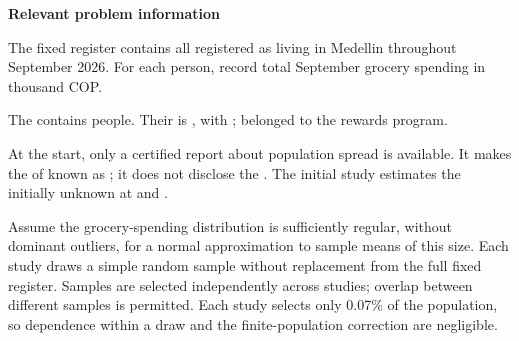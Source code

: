 \secInicio[][sec:p1]

\clearpage



\textbf{Relevant problem information}

\begin{probleminfoexcerpt}
The fixed register contains all    registered as living in Medellin throughout September 2026. For each person, record total September grocery spending in thousand COP.
\end{probleminfoexcerpt}

\begin{probleminfoexcerpt}
The     contains  people. Their    is   , with      ;  belonged to the rewards program.
\end{probleminfoexcerpt}

\begin{probleminfoexcerpt}
At the start, only a certified report about population spread is available. It makes the    of  known as   ; it does not disclose the   . The initial study estimates the initially unknown   at  and  .
\end{probleminfoexcerpt}

\begin{probleminfoexcerpt}
Assume the grocery-spending distribution is sufficiently regular, without dominant outliers, for a normal approximation to sample means of this size. Each study draws a simple random sample without replacement from the full fixed register. Samples are selected independently across studies; overlap between different samples is permitted. Each study selects only 0.07\% of the population, so dependence within a draw and the finite-population correction are negligible.
\end{probleminfoexcerpt}

